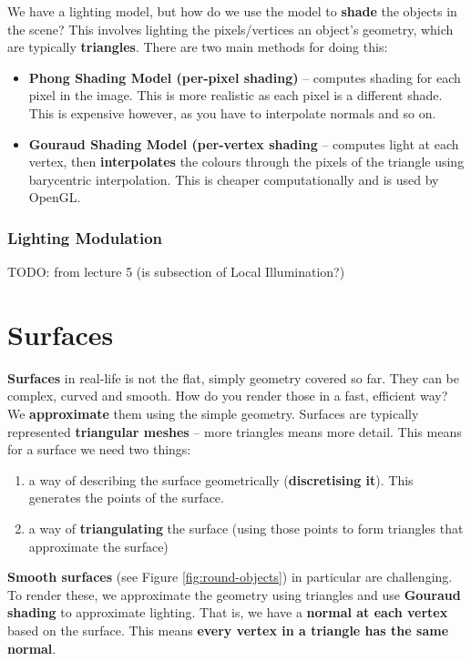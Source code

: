 \documentclass{article}
\begin{document}
We have a lighting model, but how do we use the model to \textbf{shade} the objects in the scene? This involves lighting the pixels/vertices an object's geometry, which are typically \textbf{triangles}. There are two main methods for doing this:
\begin{itemize}
	\item \textbf{Phong Shading Model (per-pixel shading)} -- computes shading for each pixel in the image. This is more realistic as each pixel is a different shade. This is expensive however, as you have to interpolate normals and so on.
	\item \textbf{Gouraud Shading Model (per-vertex shading} -- computes light at each vertex, then \textbf{interpolates} the colours through the pixels of the triangle using barycentric interpolation. This is cheaper computationally and is used by OpenGL.
\end{itemize}

\subsubsection{Lighting Modulation}

TODO: from lecture 5 (is subsection of Local Illumination?)

\section{Surfaces}

\textbf{Surfaces} in real-life is not the flat, simply geometry covered so far. They can be complex, curved and smooth. How do you render those in a fast, efficient way? We \textbf{approximate} them using the simple geometry. Surfaces are typically represented  \textbf{triangular meshes} -- more triangles means more detail. This means for a surface we need two things:
\begin{enumerate}
	\item a way of describing the surface geometrically (\textbf{discretising it}). This generates the points of the surface.
	\item a way of \textbf{triangulating} the surface (using those points to form triangles that approximate the surface)
\end{enumerate}

\textbf{Smooth surfaces} (see Figure \ref{fig:round-objects}) in particular are challenging. To render these, we approximate the geometry using triangles and use \textbf{Gouraud shading} to approximate lighting. That is, we have a \textbf{normal at each vertex} based on the surface. This means \textbf{every vertex in a triangle has the same normal}.
\end{document}
